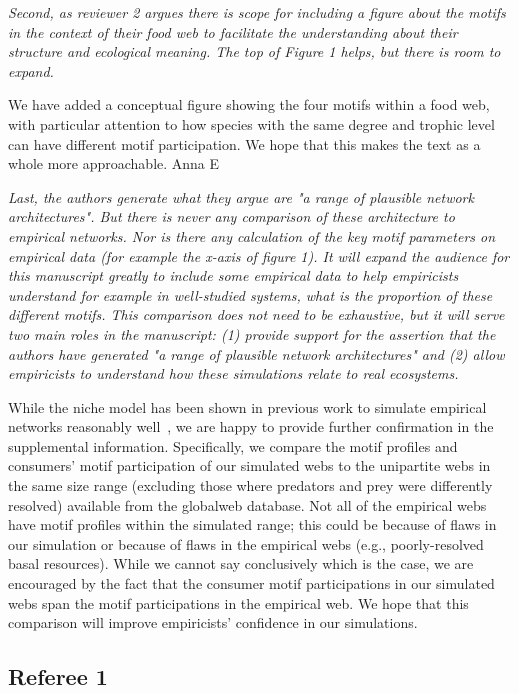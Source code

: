 \documentclass[12pt]{article}
\newcommand{\us}{\rm \setlength{\leftskip}{0.3cm} \setlength{\rightskip}{0.3cm}}
\newcommand{\them}{\it \setlength{\leftskip}{0cm} \setlength{\rightskip}{0cm}}
\begin{document}
    \them
    Second, as reviewer 2 argues there is scope for including a figure about the motifs in the context of their food web to facilitate the understanding about their structure and ecological meaning. The top of Figure 1 helps, but there is room to expand.  
    
    \us
    We have added a conceptual figure showing the four motifs within a food web, with particular attention to how species with the same degree and trophic level can have different motif participation. We hope that this makes the text as a whole more approachable.
    Anna E
    
    \them
    Last, the authors generate what they argue are "a range of plausible network architectures".  But there is never any comparison of these architecture to empirical networks.  Nor is there any calculation of the key motif parameters on empirical data (for example the x-axis of figure 1). It will expand the audience for this manuscript greatly to include some empirical data to help empiricists understand for example in well-studied systems, what is the proportion of these different motifs.  This comparison does not need to be exhaustive, but it will serve two main roles in the manuscript: (1) provide support for the assertion that the authors have generated "a range of plausible network architectures" and (2) allow empiricists to understand how these simulations relate to real ecosystems.  
    
    \us
    While the niche model has been shown in previous work to simulate empirical networks reasonably well~\citep{Stouffer2005a,Stouffer2006}, we are happy to provide further confirmation in the supplemental information.
    Specifically, we compare the motif profiles and consumers' motif participation of our simulated webs to the  unipartite webs in the same size range (excluding those where predators and prey were differently resolved) available from the globalweb database.
    Not all of the empirical webs have motif profiles within the simulated range; this could be because of flaws in our simulation or because of flaws in the empirical webs (e.g., poorly-resolved basal resources). 
    While we cannot say conclusively which is the case, we are encouraged by the fact that the consumer motif participations in our simulated webs span the motif participations in the empirical web.
    We hope that this comparison will improve empiricists' confidence in our simulations.

\clearpage

\subsection*{Referee 1}
\end{document}
